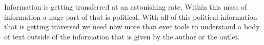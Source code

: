 Information is getting transferred at an astonishing rate.
Within this mass of information a huge part of that is political.
With all of this political information that is getting traversed we need now more than ever tools to understand a body of text outside of the information that is given by the author or the outlet.

